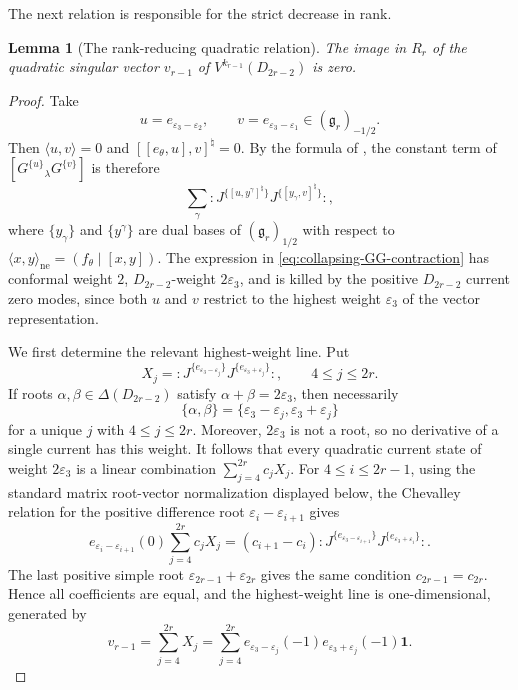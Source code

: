 \documentclass[11pt,reqno]{amsart}
\newtheorem{lemma}[theorem]{Lemma}
\theoremstyle{definition}
\theoremstyle{remark}
\providecommand{\Vac}{\mathbf{1}}
\begin{document}
The next relation is responsible for the strict decrease in rank.

\begin{lemma}[The rank-reducing quadratic relation]
\label{lem:collapsing-quadratic-relation}
The image in $R_r$ of the quadratic singular vector $v_{r-1}$ of
$V^{k_{r-1}}(D_{2r-2})$ is zero.
\end{lemma}

\begin{proof}
Take
\begin{equation*}
  u=e_{\varepsilon_3-\varepsilon_2},
  \qquad
  v=e_{\varepsilon_3-\varepsilon_1}
  \in(\mathfrak g_r)_{-1/2}.
\end{equation*}
Then $\langle u,v\rangle=0$ and
$[[e_\theta,u],v]^\natural=0$.  By the formula of
\cite[Lemma~3.1]{AdamovicKacMosenederFrajriaPapiPerse2018}, the constant
term of $[G^{\{u\}}{}_{\lambda}G^{\{v\}}]$ is therefore
\begin{equation}
 \sum_{\gamma}
 :J^{\{[u,y^\gamma]^\natural\}}
  J^{\{[y_\gamma,v]^\natural\}}:,
 \label{eq:collapsing-GG-contraction}
\end{equation}
where $\{y_\gamma\}$ and $\{y^\gamma\}$ are dual bases of
$(\mathfrak g_r)_{1/2}$ with respect to
$\langle x,y\rangle_{\mathrm{ne}}=(f_\theta\mid[x,y])$.
The expression in \eqref{eq:collapsing-GG-contraction} has conformal
weight $2$, $D_{2r-2}$-weight $2\varepsilon_3$, and is killed by the
positive $D_{2r-2}$ current zero modes, since both $u$ and $v$ restrict to
the highest weight $\varepsilon_3$ of the vector representation.

We first determine the relevant highest-weight line.  Put
\begin{equation*}
 X_j=
 :J^{\{e_{\varepsilon_3-\varepsilon_j}\}}
  J^{\{e_{\varepsilon_3+\varepsilon_j}\}}:,
 \qquad 4\le j\le2r.
\end{equation*}
If roots $\alpha,\beta\in\Delta(D_{2r-2})$ satisfy
$\alpha+\beta=2\varepsilon_3$, then necessarily
\[
  \{\alpha,\beta\}
  =\{\varepsilon_3-\varepsilon_j,
       \varepsilon_3+\varepsilon_j\}
\]
for a unique $j$ with $4\le j\le2r$.  Moreover,
$2\varepsilon_3$ is not a root, so no derivative of a single current has
this weight.  It follows that every quadratic current state of weight
$2\varepsilon_3$ is a linear combination
$\sum_{j=4}^{2r}c_jX_j$.  For
$4\le i\le2r-1$, using the standard matrix root-vector normalization
displayed below, the Chevalley relation for the positive difference root
$\varepsilon_i-\varepsilon_{i+1}$ gives
\begin{equation*}
 e_{\varepsilon_i-\varepsilon_{i+1}}(0)
 \sum_{j=4}^{2r}c_jX_j
 =(c_{i+1}-c_i)
 :J^{\{e_{\varepsilon_3-\varepsilon_{i+1}}\}}
  J^{\{e_{\varepsilon_3+\varepsilon_i}\}}:.
\end{equation*}
The last positive simple root
$\varepsilon_{2r-1}+\varepsilon_{2r}$ gives the same condition
$c_{2r-1}=c_{2r}$.  Hence all coefficients are equal, and the
highest-weight line is one-dimensional, generated by
\begin{equation*}
 v_{r-1}
 =\sum_{j=4}^{2r}X_j
 =\sum_{j=4}^{2r}
 e_{\varepsilon_3-\varepsilon_j}(-1)
 e_{\varepsilon_3+\varepsilon_j}(-1)\Vac.
\end{equation*}


\end{proof}
\end{document}
